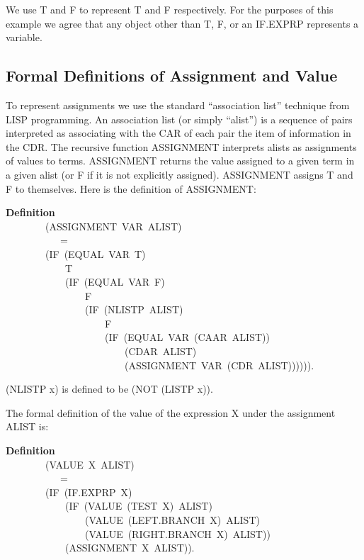 \documentclass[10pt]{book}
\newenvironment{pubasis}{\begin{flushleft}}{\end{flushleft}}
\newcommand{\axiomordefinition}[1]{\vspace{6pt}\Large\textsf{\textbf{#1}}\normalsize}
\begin{document}
We  use T and F to represent T and F respectively.
For the purposes of this example
we agree that any object other than T, F, or an
IF.EXPRP  represents a  variable.
\subsection{Formal Definitions of Assignment and Value}
To represent assignments we  use the standard ``association list''
technique from LISP programming.  An association list (or simply ``alist'') is  a sequence of
pairs interpreted as
associating with the CAR of each pair the item of information in the CDR.
The recursive function  ASSIGNMENT interprets
alists as assignments of  values to terms.
ASSIGNMENT returns the  value
assigned to a given term in
a given alist (or F if it is not explicitly assigned).    ASSIGNMENT assigns T and F to themselves.
Here is the definition of ASSIGNMENT:
\begin{pubasis}
\axiomordefinition{Definition}\\
~~~~~~~~(ASSIGNMENT~VAR~ALIST)\\
~~~~~~~~~~~=\\
~~~~~~~~(IF~(EQUAL~VAR~T)\\
~~~~~~~~~~~~T\\
~~~~~~~~~~~~(IF~(EQUAL~VAR~F)\\
~~~~~~~~~~~~~~~~F\\
~~~~~~~~~~~~~~~~(IF~(NLISTP~ALIST)\\
~~~~~~~~~~~~~~~~~~~~F\\
~~~~~~~~~~~~~~~~~~~~(IF~(EQUAL~VAR~(CAAR~ALIST))\\
~~~~~~~~~~~~~~~~~~~~~~~~(CDAR~ALIST)\\
~~~~~~~~~~~~~~~~~~~~~~~~(ASSIGNMENT~VAR~(CDR~ALIST)))))).\\
\end{pubasis}
(NLISTP x) is defined to be (NOT (LISTP x)).

The formal definition of the value of the expression X under the
assignment ALIST is:
\begin{pubasis}
\axiomordefinition{Definition}\\
~~~~~~~~(VALUE~X~ALIST)\\
~~~~~~~~~~~=\\
~~~~~~~~(IF~(IF.EXPRP~X)\\
~~~~~~~~~~~~(IF~(VALUE~(TEST~X)~ALIST)\\
~~~~~~~~~~~~~~~~(VALUE~(LEFT.BRANCH~X)~ALIST)\\
~~~~~~~~~~~~~~~~(VALUE~(RIGHT.BRANCH~X)~ALIST))\\
~~~~~~~~~~~~(ASSIGNMENT~X~ALIST)).\\
\end{pubasis}
\end{document}
